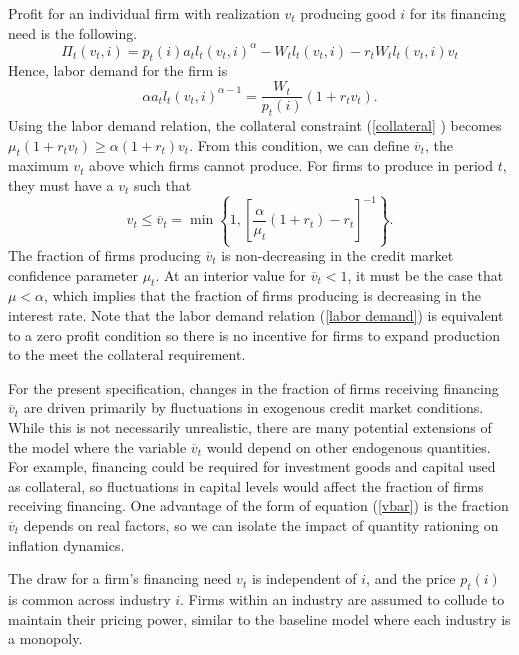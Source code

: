 \documentclass{article}
\begin{document}
Profit for an individual firm with realization $v_{t}$ producing good $i$
for its financing need is the following.
\begin{equation*}
\mathsf{\Pi }_{t}\left( v_{t},i\right) =p_{t}\left( i\right)
a_{t}l_{t}\left( v_{t},i\right) ^{\alpha }-W_{t}l_{t}\left( v_{t},i\right)
-r_{t}W_{t}l_{t}\left( v_{t},i\right) v_{t}
\end{equation*}
Hence, labor demand for the firm is
\begin{equation}
\alpha a_{t}l_{t}\left( v_{t},i\right) ^{\alpha -1}=\frac{W_{t}}{p_{t}\left(
i\right) }\left( 1+r_{t}v_{t}\right) .  \label{labor demand}
\end{equation}
Using the labor demand relation, the collateral constraint (\ref{collateral}%
) becomes $\mu _{t}\left( 1+r_{t}v_{t}\right) \geq \alpha \left(
1+r_{t}\right) v_{t}$. From this condition, we can define $\overline{v}%
_{t}$, the maximum $v_{t}$ above which firms cannot produce. For firms
to produce in period $t$, they must have a $v_{t}$ such that
\begin{equation}
v_{t}\leq \overline{v}_{t}=\min \left\{ 1,\left[ \frac{\alpha }{\mu _{t}}%
\left( 1+r_{t}\right) -r_{t}\right] ^{-1}\right\} .  \label{vbar}
\end{equation}
The fraction of firms producing $\overline{v}_{t}$ is non-decreasing in the
credit market confidence parameter $\mu _{t}$. At an interior value for $%
\overline{v}_{t}<1$, it must be the case that $\mu <\alpha$, which implies
that the fraction of firms producing is decreasing in the interest rate.
Note that the labor demand relation (\ref{labor demand}) is equivalent to a
zero profit condition so there is no incentive for firms to expand
production to the meet the collateral requirement.

For the present specification, changes in the fraction of firms receiving
financing $\overline{v}_{t}$ are driven primarily by fluctuations in
exogenous credit market conditions. While this is not necessarily
unrealistic, there are many potential extensions of the model where the
variable $\overline{v}_{t}$ would depend on other endogenous quantities.
For example, financing could be required for investment goods and capital
used as collateral, so fluctuations in capital levels would affect the
fraction of firms receiving financing. One advantage of the form of
equation (\ref{vbar}) is the fraction $\overline{v}_{t}$ depends on real
factors, so we can isolate the impact of quantity rationing on inflation
dynamics.

The draw for a firm's financing need $v_{t}$ is independent of $i$, and the
price $p_{t}\left( i\right)$ is common across industry $i$. Firms within
an industry are assumed to collude to maintain their pricing power, similar
to the baseline model where each industry is a monopoly.
\end{document}
